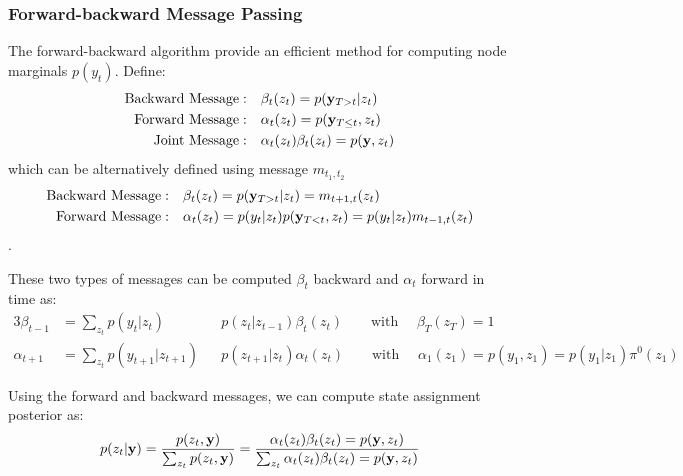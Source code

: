 \documentclass{article} %
\begin{document}
\subsubsection{Forward-backward Message Passing} \label{sec:FBMP}
The forward-backward algorithm provide an efficient method for computing node marginals $p(y_t)$. Define:
\begin{align*}
\mbox{Backward Message}: \quad &
\beta_t(z_t) = p({\bf y}_{T>t} | z_t)
\\
\mbox{Forward Message}: \quad &
\alpha_t(z_t) = p({\bf y}_{T \leq t}, z_t)
\\
\mbox{Joint Message}: \quad &
\alpha_t(z_t)\beta_t(z_t) = p({\bf y}, z_t)
\end{align*}
which can be alternatively defined using message $m_{t_1, t_2}$
\begin{align*}
\mbox{Backward Message}: \quad &
\beta_t(z_t) = p({\bf y}_{T>t}|z_t) = m_{t+1, t}(z_t)
\\
\mbox{Forward Message}: \quad &
\alpha_t(z_t) = p(y_t | z_t ) p({\bf y}_{T<t}, z_t) =
p(y_t | z_t ) m_{t-1, t}(z_t)
\end{align*}.

These two types of messages can be computed $\beta_t$ backward and $\alpha_t$ forward in time as:
\begin{alignat*}{3}
\beta_{t-1} &= \sum_{z_t}
p(y_{t} | z_t ) && p(z_t | z_{t-1})  \beta_{t}(z_t)
\qquad \mbox{with } \quad
\beta_T(z_T) = 1
\\
\alpha_{t+1}  &=  \sum_{z_t}
p(y_{t+1} | z_{t+1} ) && p(z_{t+1} | z_{t})  \alpha_{t}(z_t)
\qquad \mbox{with } \quad
\alpha_1(z_1) = p(y_1, z_1) = p(y_1 | z_1) \pi^0(z_1)
\end{alignat*}

Using the forward and backward messages, we can compute state assignment posterior as:
\begin{align*}
p(z_t | {\bf y}) = \frac{p(z_t, {\bf y})}{\sum_{z_t} p(z_t, {\bf y})}
=
\frac{\alpha_t(z_t)\beta_t(z_t) = p({\bf y}, z_t)}
{\sum_{z_t} \alpha_t(z_t)\beta_t(z_t) = p({\bf y}, z_t)}
\end{align*}


\clearpage
\end{document}
